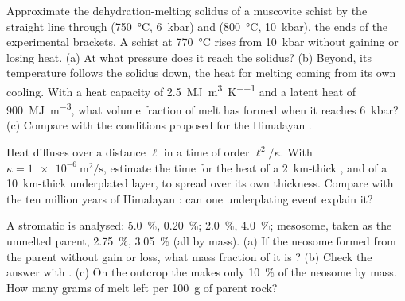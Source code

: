 \begin{exercise}[$\star\star\star$]\label{exo:b2:crustal-melting:10}
Approximate the dehydration-melting solidus of a muscovite schist by the straight line
through (\qty{750}{\celsius}, \qty{6}{kbar}) and (\qty{800}{\celsius}, \qty{10}{kbar}),
the ends of the experimental brackets. A schist at \qty{770}{\celsius} rises from
\qty{10}{kbar} without gaining or losing heat. (a) At what pressure does it reach the
solidus? (b) Beyond, its temperature follows the solidus down, the heat for melting coming
from its own cooling. With a heat capacity of \qty{2.5}{\mega\joule\per\cubic\metre\per\kelvin}
and a latent heat of \qty{900}{\mega\joule\per\cubic\metre}, what volume fraction of melt
has formed when it reaches \qty{6}{kbar}? (c) Compare with the conditions proposed for the
Himalayan .
\end{exercise}

\begin{exercise}[$\star\star\star$]\label{exo:b2:crustal-melting:11}
Heat diffuses over a distance $\ell$ in a time of order $\ell^2/\kappa$. With
$\kappa = \qty{1e-6}{\square\metre\per\second}$, estimate the time for the heat of a
\qty{2}{km}-thick , and of a \qty{10}{km}-thick underplated layer, to spread over its
own thickness. Compare with the ten million years of Himalayan : can one
underplating event explain it?
\end{exercise}

\begin{exercise}[$\star\star\star$]\label{exo:b2:crustal-melting:12}
A stromatic  is analysed:   \qty{5.0}{\percent}, 
\qty{0.20}{\percent};   \qty{2.0}{\percent}, 
\qty{4.0}{\percent}; mesosome, taken as the unmelted parent, 
\qty{2.75}{\percent},  \qty{3.05}{\percent} (all by mass). (a) If the
neosome formed from the parent without gain or loss, what mass fraction of it is
? (b) Check the answer with . (c) On the outcrop the  makes only
\qty{10}{\percent} of the neosome by mass. How many grams of melt left per
\qty{100}{\gram} of parent rock?
\end{exercise}

